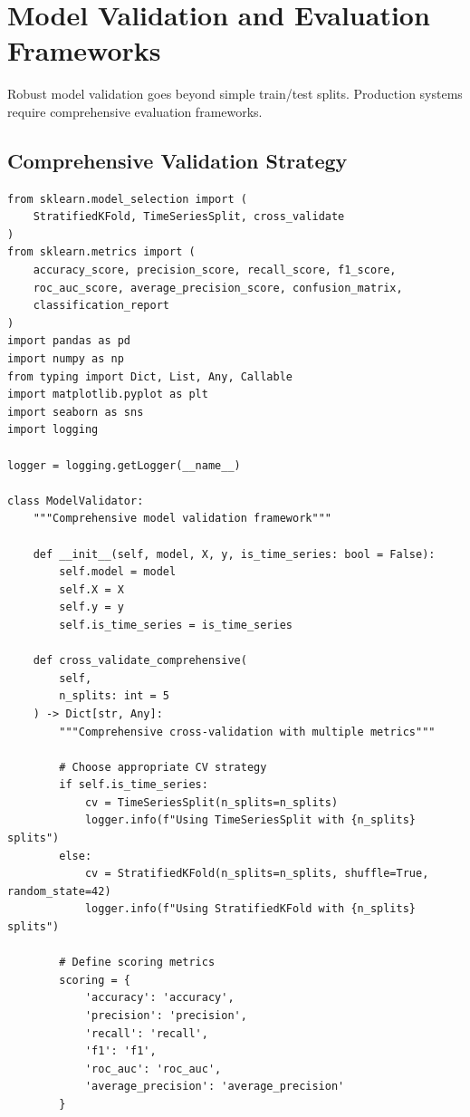 \section{Model Validation and Evaluation Frameworks}

Robust model validation goes beyond simple train/test splits. Production systems require comprehensive evaluation frameworks.

\subsection{Comprehensive Validation Strategy}

\begin{lstlisting}[style=python, caption=Production Model Validation Framework]
from sklearn.model_selection import (
    StratifiedKFold, TimeSeriesSplit, cross_validate
)
from sklearn.metrics import (
    accuracy_score, precision_score, recall_score, f1_score,
    roc_auc_score, average_precision_score, confusion_matrix,
    classification_report
)
import pandas as pd
import numpy as np
from typing import Dict, List, Any, Callable
import matplotlib.pyplot as plt
import seaborn as sns
import logging

logger = logging.getLogger(__name__)

class ModelValidator:
    """Comprehensive model validation framework"""

    def __init__(self, model, X, y, is_time_series: bool = False):
        self.model = model
        self.X = X
        self.y = y
        self.is_time_series = is_time_series

    def cross_validate_comprehensive(
        self,
        n_splits: int = 5
    ) -> Dict[str, Any]:
        """Comprehensive cross-validation with multiple metrics"""

        # Choose appropriate CV strategy
        if self.is_time_series:
            cv = TimeSeriesSplit(n_splits=n_splits)
            logger.info(f"Using TimeSeriesSplit with {n_splits} splits")
        else:
            cv = StratifiedKFold(n_splits=n_splits, shuffle=True, random_state=42)
            logger.info(f"Using StratifiedKFold with {n_splits} splits")

        # Define scoring metrics
        scoring = {
            'accuracy': 'accuracy',
            'precision': 'precision',
            'recall': 'recall',
            'f1': 'f1',
            'roc_auc': 'roc_auc',
            'average_precision': 'average_precision'
        }


\end{lstlisting}
